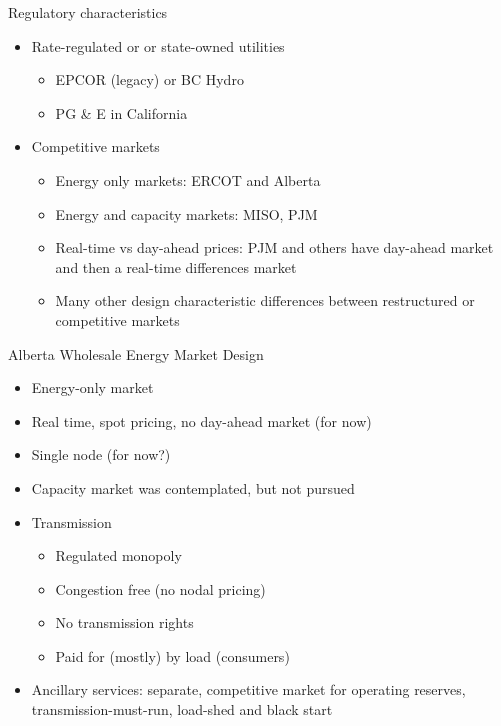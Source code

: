 \documentclass[aspectratio=169]{beamer}
\renewcommand{\(}{\begin{columns}}
\renewcommand{\)}{\end{columns}}
\newcommand{\<}[1]{\begin{column}{#1}}
\renewcommand{\>}{\end{column}}
\begin{document}
\begin{frame}{Regulatory characteristics}
\begin{itemize}
\setlength\itemsep{1.25em}
\item Rate-regulated or or state-owned utilities
\begin{itemize}
\setlength\itemsep{.15em}
\item EPCOR (legacy) or BC Hydro
\item PG \& E in California
\end{itemize}

\item Competitive markets
\begin{itemize}
\setlength\itemsep{.15em}
\item Energy only markets: ERCOT and Alberta
\item Energy and capacity markets: MISO, PJM
\item Real-time vs day-ahead prices: PJM and others have day-ahead market and then a real-time differences market
\item Many other design characteristic differences between restructured or competitive markets
\end{itemize}
\end{itemize}
\vfill
\end{frame}


\begin{frame}{Alberta Wholesale Energy Market Design}
\begin{itemize}
\setlength\itemsep{.25em}
\item Energy-only market
\item Real time, spot pricing, no day-ahead market (for now)
\item Single node (for now?)
\item Capacity market was contemplated, but not pursued
\item Transmission
\begin{itemize}
\setlength\itemsep{.25em}
\item Regulated monopoly
\item Congestion free (no nodal pricing)
\item No transmission rights
\item Paid for (mostly) by load (consumers)
\end{itemize}
\item Ancillary services: separate, competitive market for operating reserves, transmission-must-run, load-shed and black start
\end{itemize}

\vfill
\end{frame}
\end{document}
